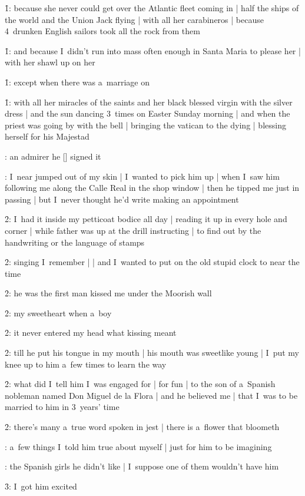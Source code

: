 \f1:
because she never could get over the Atlantic fleet coming in |
half the ships of the world and the Union Jack flying |
with all her carabineros |
because 4~drunken English sailors took all the rock from them

\f1:
and because I~didn't run into mass often enough in Santa Maria to please her |
with her shawl up on her

\f1:
except when there was a~marriage on

\f1:
with all her miracles of the saints and her black blessed virgin with the silver dress |
and the sun dancing 3~times on Easter Sunday morning |
and when the priest was going by with the bell |
bringing the vatican to the dying |
blessing herself for his Majestad

:
an admirer he [\mulvey] signed it

:
I~near jumped out of my skin |
I~wanted to pick him up |
when I~saw him following me along the Calle Real in the shop window |
then he tipped me just in passing |
but I~never thought he'd write making an appointment

\f2:
I~had it inside my petticoat bodice all day |
reading it up in every hole and corner |
while father was up at the drill instructing |
to find out by the handwriting or the language of stamps

\f2:
singing I~remember |
 |
and I~wanted to put on the old stupid clock to near the time

\f2:
he was the first man kissed me under the Moorish wall

\f2:
my sweetheart when a~boy

\f2:
it never entered my head what kissing meant

\f2:
till he put his tongue in my mouth |
his mouth was sweetlike young |
I~put my knee up to him a~few times to learn the way

\f2:
what did I~tell him I~was engaged for |
for fun |
to the son of a~Spanish nobleman named Don Miguel de la Flora |
and he believed me |
that I~was to be married to him in 3~years' time

\f2:
there's many a~true word spoken in jest |
there is a~flower that bloometh

:
a~few things I~told him true about myself |
just for him to be imagining

:
the Spanish girls he didn't like |
I~suppose one of them wouldn't have him

\f3:
I~got him excited

